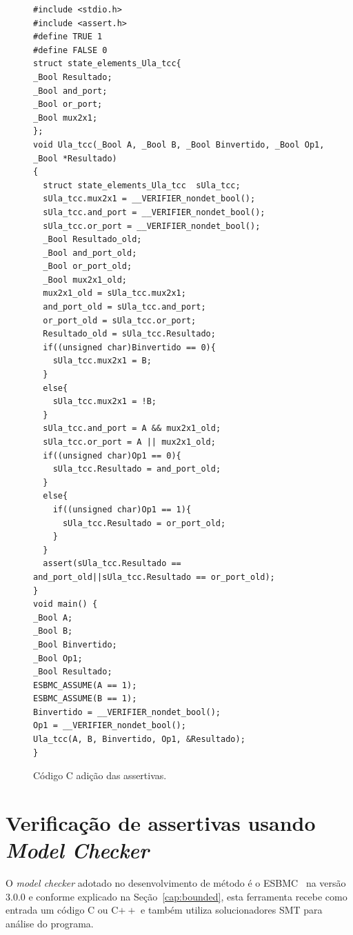 \begin{figure}[H]
\caption{\label{fig:codigo_C_assert} Código C adição das assertivas.}
	\begin{center}
    \begin{minipage}{0.7\textwidth}
    \begin{lstlisting}
#include <stdio.h>
#include <assert.h>
#define TRUE 1
#define FALSE 0
struct state_elements_Ula_tcc{
_Bool Resultado;
_Bool and_port;
_Bool or_port;
_Bool mux2x1;
};
void Ula_tcc(_Bool A, _Bool B, _Bool Binvertido, _Bool Op1, _Bool *Resultado)
{
  struct state_elements_Ula_tcc  sUla_tcc;
  sUla_tcc.mux2x1 = __VERIFIER_nondet_bool();
  sUla_tcc.and_port = __VERIFIER_nondet_bool();
  sUla_tcc.or_port = __VERIFIER_nondet_bool();
  _Bool Resultado_old;
  _Bool and_port_old;
  _Bool or_port_old;
  _Bool mux2x1_old;
  mux2x1_old = sUla_tcc.mux2x1;
  and_port_old = sUla_tcc.and_port;
  or_port_old = sUla_tcc.or_port;
  Resultado_old = sUla_tcc.Resultado;
  if((unsigned char)Binvertido == 0){
    sUla_tcc.mux2x1 = B;
  }
  else{
    sUla_tcc.mux2x1 = !B;
  }
  sUla_tcc.and_port = A && mux2x1_old;
  sUla_tcc.or_port = A || mux2x1_old;
  if((unsigned char)Op1 == 0){
    sUla_tcc.Resultado = and_port_old;
  }
  else{
    if((unsigned char)Op1 == 1){
      sUla_tcc.Resultado = or_port_old;
    }
  }
  assert(sUla_tcc.Resultado == and_port_old||sUla_tcc.Resultado == or_port_old);
}
void main() {
_Bool A;
_Bool B;
_Bool Binvertido;
_Bool Op1;
_Bool Resultado;
ESBMC_ASSUME(A == 1);
ESBMC_ASSUME(B == 1);
Binvertido = __VERIFIER_nondet_bool();
Op1 = __VERIFIER_nondet_bool();
Ula_tcc(A, B, Binvertido, Op1, &Resultado);
}
    \end{lstlisting}
    \end{minipage}
	\end{center}
\end{figure}
\section{Verificação de assertivas usando \textit{Model Checker}}

\par
O \textit{model checker} adotado no desenvolvimento de método é o ESBMC~\cite{cordeiro2012smt} na versão $3.0.0$ e conforme explicado na Seção~\ref{cap:bounded}, esta ferramenta recebe como entrada um código C ou C$++$ e também utiliza solucionadores SMT para análise do programa.

